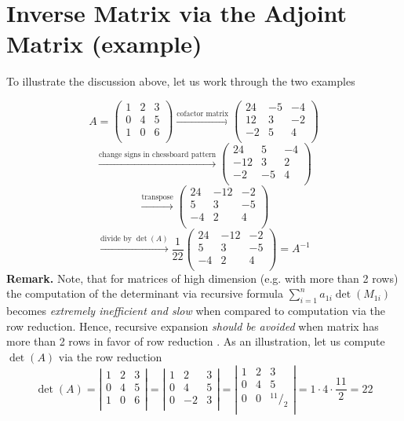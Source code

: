 \documentclass[8pt]{article} %
\newcommand{\myfrac}[2]{^{#1}/_{#2}}
\begin{document}
\section{Inverse Matrix via the Adjoint Matrix (example)}
To illustrate the discussion above, let us work through the two examples
\begin{myeg}
\[A=\left(\begin{array}{rrr}
1&2&3\\
0&4&5\\
1&0&6\\
\end{array}\right)
	\xrightarrow{\text{cofactor matrix}}\left(\begin{array}{rrr}
24&-5&-4\\
12&3&-2\\
-2&5&4\\
\end{array}\right)
		\]
	\[\xrightarrow{\text{change signs in chessboard pattern}}
\left(\begin{array}{rrr}24&5&-4\\
-12&3&2\\
-2&-5&4\\
\end{array}\right)
		\]
	\[\xrightarrow{\text{transpose}}
\left(\begin{array}{rrr}
24&-12&-2\\
5&3&-5\\
-4&2&4\\
\end{array}\right)
		\]
		\[\xrightarrow{\text{divide by $\det(A)$}}\frac{1}{22}
\left(\begin{array}{rrr}
24&-12&-2\\
5&3&-5\\
-4&2&4\\
\end{array}\right)
		=A^{-1}\]
\textbf{Remark. } Note, that for matrices of high dimension (e.g. with {more }than 2 rows) the computation of the determinant via recursive
formula $\sum_{i=1}^n a_{1i}\det(M_{1i})$ becomes \textit{extremely inefficient and slow
} when compared to computation via the row reduction. Hence, recursive expansion
\textit{should be avoided} when matrix has more than 2 rows in favor of row reduction
. As an illustration, let us compute $\det(A)$ via the row reduction
\[
\det(A)=
\left|\begin{array}{rrr}
1&2&3\\
0&4&5\\
1&0&6\\
\end{array}\right|=
\left|\begin{array}{rrr}
1&2&3\\
0&4&5\\
0&-2&3\\
\end{array}\right|=
\left|\begin{array}{rrr}
1&2&3\\
0&4&5\\
0&0&\myfrac{11}{2}\\
\end{array}\right|=1\cdot4\cdot\frac{11}{2}=22
\]
\end{myeg}
\end{document}
